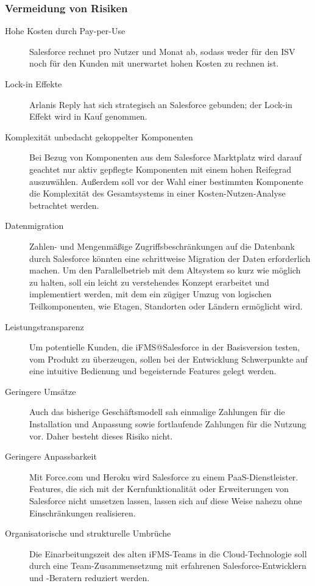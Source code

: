 \subsubsection{Vermeidung von Risiken}
\begin{description}
	\item[Hohe Kosten durch Pay-per-Use] Salesforce rechnet pro Nutzer und 
Monat ab, sodass weder für den ISV noch für den Kunden mit 
unerwartet hohen Kosten zu rechnen ist.
	\item[Lock-in Effekte] Arlanis Reply hat sich strategisch an Salesforce 
gebunden; der Lock-in Effekt wird in Kauf genommen.
	\item[Komplexität unbedacht gekoppelter Komponenten] Bei Bezug 
von Komponenten aus dem Salesforce Marktplatz wird darauf geachtet nur aktiv 
gepflegte Komponenten mit einem hohen Reifegrad auszuwählen. Außerdem soll vor 
der Wahl einer bestimmten Komponente die Komplexität des Gesamtsystems in einer 
Kosten-Nutzen-Analyse betrachtet werden.
	\item[Datenmigration] Zahlen- und Mengenmäßige Zugriffsbeschränkungen 
auf die Datenbank durch Salesforce könnten eine schrittweise Migration der 
Daten erforderlich machen. Um den Parallelbetrieb mit dem Altsystem so kurz wie 
möglich zu halten, soll ein leicht zu verstehendes Konzept erarbeitet und 
implementiert werden, mit dem ein zügiger Umzug von logischen Teilkomponenten, 
wie Etagen, Standorten oder Ländern ermöglicht wird.
	\item[Leistungstransparenz] Um potentielle Kunden, die iFMS@Salesforce 
in der Basisversion testen, vom Produkt zu überzeugen, sollen bei der 
Entwicklung Schwerpunkte auf eine intuitive Bedienung und begeisternde Features 
gelegt werden.
	\item[Geringere Umsätze] Auch das bisherige Geschäftsmodell sah 
einmalige Zahlungen für die Installation und Anpassung sowie fortlaufende Zahlungen 
für die Nutzung vor. Daher besteht dieses Risiko nicht. 
	\item[Geringere Anpassbarkeit] Mit Force.com und Heroku wird Salesforce 
zu einem PaaS-Dienstleister. Features, die sich mit der 
Kernfunktionalität oder Erweiterungen von Salesforce nicht umsetzen lassen, 
lassen sich auf diese Weise nahezu ohne Einschränkungen realisieren.
	\item[Organisatorische und strukturelle Umbrüche] Die Einarbeitungszeit 
des alten iFMS-Teams in die Cloud-Technologie soll durch eine 
Team-Zusammensetzung mit erfahrenen Salesforce-Entwicklern und -Beratern 
reduziert werden. \\

\end{description}
